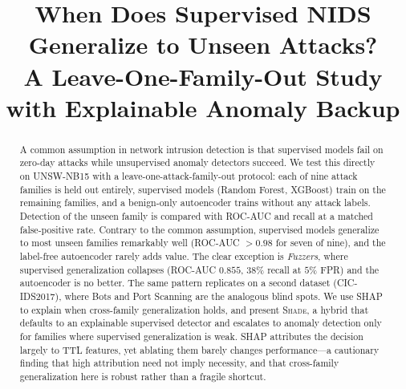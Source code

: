 \documentclass[conference]{IEEEtran}
\begin{document}
\title{When Does Supervised NIDS Generalize to Unseen Attacks?\\
A Leave-One-Family-Out Study with Explainable Anomaly Backup}

\author{
\and
{}
\and
{}
}

\maketitle

\begin{abstract}
A common assumption in network intrusion detection is that supervised models fail
on zero-day attacks while unsupervised anomaly detectors succeed. We test this
directly on UNSW-NB15 with a leave-one-attack-family-out protocol: each of nine
attack families is held out entirely, supervised models (Random Forest, XGBoost)
train on the remaining families, and a benign-only autoencoder trains without any
attack labels. Detection of the unseen family is compared with ROC-AUC and
recall at a matched false-positive rate. Contrary to the common assumption,
supervised models generalize to most unseen families remarkably well (ROC-AUC
$>0.98$ for seven of nine), and the label-free autoencoder rarely adds value. The
clear exception is \emph{Fuzzers}, where supervised generalization collapses
(ROC-AUC $0.855$, $38\%$ recall at $5\%$ FPR) and the autoencoder is no better. The
same pattern replicates on a second dataset (CIC-IDS2017), where Bots and Port
Scanning are the analogous blind spots. We use SHAP to explain when cross-family
generalization holds, and present
\textsc{Shade}, a hybrid that defaults to an explainable supervised detector and
escalates to anomaly detection only for families where supervised generalization is
weak. SHAP attributes the decision largely to TTL features, yet ablating them barely
changes performance---a cautionary finding that high attribution need not imply
necessity, and that cross-family generalization here is robust rather than a fragile
shortcut.
\end{abstract}
\end{document}
